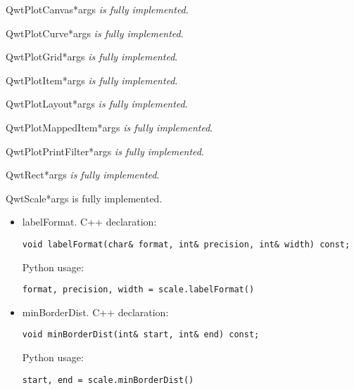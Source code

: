 \documentclass{manual}
\begin{document}
\begin{classdesc}{QwtPlotCanvas}{*args}
\emph{is fully implemented}.
\end{classdesc}

\begin{classdesc}{QwtPlotCurve}{*args}
\emph{is fully implemented}.
\end{classdesc}

\begin{classdesc}{QwtPlotGrid}{*args}
\emph{is fully implemented}.
\end{classdesc}

\begin{classdesc}{QwtPlotItem}{*args}
\emph{is fully implemented}.
\end{classdesc}

\begin{classdesc}{QwtPlotLayout}{*args}
\emph{is fully implemented}.
\end{classdesc}

\begin{classdesc}{QwtPlotMappedItem}{*args}
\emph{is fully implemented}.
\end{classdesc}

\begin{classdesc}{QwtPlotPrintFilter}{*args}
\emph{is fully implemented}.
\end{classdesc}

\begin{classdesc}{QwtRect}{*args}
\emph{is fully implemented}.
\end{classdesc}

\begin{classdesc}{QwtScale}{*args}
{is fully implemented}.

  \begin{itemize}

    \item{labelFormat}. C++ declaration:
      \begin{verbatim}
void labelFormat(char& format, int& precision, int& width) const;
      \end{verbatim}
      Python usage:
      \begin{verbatim}
format, precision, width = scale.labelFormat()
      \end{verbatim}

    \item{minBorderDist}. C++ declaration:
      \begin{verbatim}
void minBorderDist(int& start, int& end) const;
      \end{verbatim}
      Python usage:
      \begin{verbatim}
start, end = scale.minBorderDist()
      \end{verbatim}

  \end{itemize}
\end{classdesc}
\end{document}
